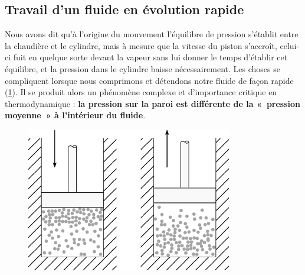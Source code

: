 	\subsection{Travail d’un fluide en évolution rapide}
	\label{ch_évolutions_irr_sf}

			Nous avons dit qu’à l’origine du mouvement l’équilibre de pression s’établit entre la chaudière et le cylindre, mais à mesure que la vitesse du piston s’accroît, celui-ci fuit en quelque sorte devant la vapeur sans lui donner le temps d’établir cet équilibre, et la pression dans le cylindre baisse \mbox{nécessairement}.
		Les choses se compliquent lorsque nous comprimons et détendons notre fluide de façon rapide (\cref{fig_molécules_rapide}). Il se produit alors un phénomène complexe et d’importance critique en thermodynamique : \textbf{la pression sur la paroi est différente de la «~pression moyenne~» à l’intérieur du fluide}.

		\begin{figure}
			\begin{center}
			\includegraphics[width=9cm]{images/particules_compression_rapide.png}
			\end{center}
			\label{fig_molécules_rapide}
		\end{figure}

